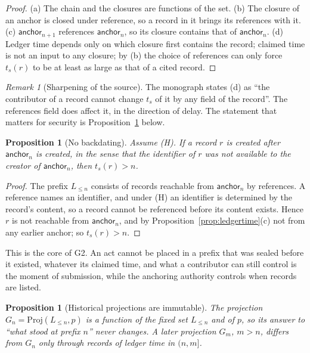 \documentclass[11pt]{article}
\theoremstyle{plain}
\newtheorem{proposition}[theorem]{Proposition}
\theoremstyle{definition}
\theoremstyle{remark}
\newtheorem{remark}[theorem]{Remark}
\newcommand{\Proj}{\mathrm{Proj}}
\begin{document}
\begin{proof}
(a) The chain and the closures are functions of the set. (b) The closure of an anchor is closed under reference, so a record in it brings its references with it. (c) $\mathsf{anchor}_{n+1}$ references $\mathsf{anchor}_n$, so its closure contains that of $\mathsf{anchor}_n$. (d) Ledger time depends only on which closure first contains the record; claimed time is not an input to any closure; by (b) the choice of references can only force $t_s(r)$ to be at least as large as that of a cited record.
\end{proof}

\begin{remark}[Sharpening of the source]
The monograph states (d) as ``the contributor of a record cannot change $t_s$ of it by any field of the record''. The references field does affect it, in the direction of delay. The statement that matters for security is Proposition~\ref{prop:nobackdate} below.
\end{remark}

\begin{proposition}[No backdating]\label{prop:nobackdate}
Assume (H). If a record $r$ is created after $\mathsf{anchor}_n$ is created, in the sense that the identifier of $r$ was not available to the creator of $\mathsf{anchor}_n$, then $t_s(r)>n$.
\end{proposition}

\begin{proof}
The prefix $L_{\le n}$ consists of records reachable from $\mathsf{anchor}_n$ by references. A reference names an identifier, and under (H) an identifier is determined by the record's content, so a record cannot be referenced before its content exists. Hence $r$ is not reachable from $\mathsf{anchor}_n$, and by Proposition~\ref{prop:ledgertime}(c) not from any earlier anchor; so $t_s(r)>n$.
\end{proof}

This is the core of G2. An act cannot be placed in a prefix that was sealed before it existed, whatever its claimed time, and what a contributor can still control is the moment of submission, while the anchoring authority controls when records are listed.

\begin{proposition}[Historical projections are immutable]\label{prop:prefix}
The projection $G_n=\Proj(L_{\le n},p)$ is a function of the fixed set $L_{\le n}$ and of $p$, so its answer to ``what stood at prefix $n$'' never changes. A later projection $G_m$, $m>n$, differs from $G_n$ only through records of ledger time in $(n,m]$.
\end{proposition}
\end{document}
